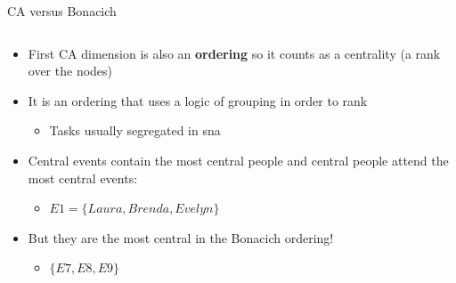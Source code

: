 \documentclass[
  ignorenonframetext,
]{beamer}
\providecommand{\tightlist}{%
  \setlength{\itemsep}{0pt}\setlength{\parskip}{0pt}}\usepackage{longtable,booktabs,array}
\begin{document}
\begin{frame}{CA versus Bonacich}
\begin{columns}[T]
\begin{column}{0.5\textwidth}
\begin{itemize}
\tightlist
\item
  First CA dimension is also an \textbf{ordering} so it counts as a
  centrality (a rank over the nodes)
\item
  It is an ordering that uses a logic of grouping in order to rank

  \begin{itemize}
  \tightlist
  \item
    Tasks usually segregated in sna
  \end{itemize}
\item
  Central events contain the most central people and central people
  attend the most central events:

  \begin{itemize}
  \tightlist
  \item
    \(E1 = \{Laura, Brenda, Evelyn\}\)
  \end{itemize}
\item
  But they are the most central in the Bonacich ordering!

  \begin{itemize}
  \tightlist
  \item
    \(\{E7, E8, E9\}\)
  \end{itemize}
\end{itemize}
\end{column}
\end{columns}
\end{frame}
\end{document}
